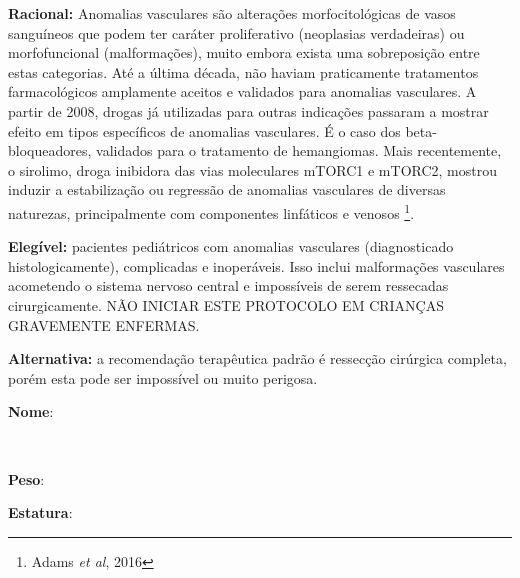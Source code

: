 \documentclass[11pt,a4paper,oldfontcommands]{memoir}
\def\entrywithlabel[#1]#2{\parbox{#1}{{\small #2:} \hrulefill}}
\begin{document}
\textbf{Racional:} Anomalias vasculares são alterações morfocitológicas de vasos sanguíneos que podem ter caráter proliferativo (neoplasias verdadeiras) ou morfofuncional (malformações), muito embora exista uma sobreposição entre estas categorias. Até a última década, não haviam praticamente tratamentos farmacológicos amplamente aceitos e validados para anomalias vasculares. A partir de 2008, drogas já utilizadas para outras indicações passaram a mostrar efeito em tipos específicos de anomalias vasculares. É o caso dos beta-bloqueadores, validados para o tratamento de hemangiomas. Mais recentemente, o sirolimo, droga inibidora das vias moleculares mTORC1 e mTORC2, mostrou induzir a estabilização ou regressão de anomalias vasculares de diversas naturezas, principalmente com componentes linfáticos e venosos \footnote{Adams \textit{et al}, 2016}.

\textbf{Elegível:} pacientes pediátricos com anomalias vasculares (diagnosticado histologicamente), complicadas e inoperáveis. Isso inclui malformações vasculares acometendo o sistema nervoso central e impossíveis de serem ressecadas cirurgicamente. NÃO INICIAR ESTE PROTOCOLO EM CRIANÇAS GRAVEMENTE ENFERMAS.

\textbf{Alternativa:} a recomendação terapêutica padrão é ressecção cirúrgica completa, porém esta pode ser impossível ou muito perigosa.
\\[0.4cm]
\entrywithlabel[1\hsize]{\textbf{Nome}}\hfill
\\[0.3cm]
\entrywithlabel[.45\hsize]{\textbf{Peso}}\hfill  \entrywithlabel[.45\hsize]{\textbf{Estatura}}
\end{document}

